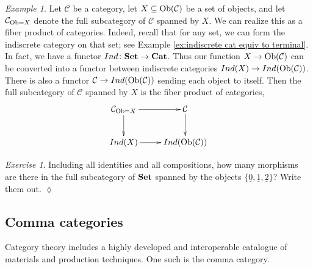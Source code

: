 \documentclass{book}
\def\tn{\textnormal}
\def\mc{\mathcal}
\def\Ob{\tn{Ob}}
\def\to{\rightarrow}
\def\taking{\colon}
\def\ss{\subseteq}
\def\ul{\underline}
\def\Cat{{\bf Cat}}
\def\Set{{\bf Set}}
\def\mcC{\mc{C}}
\theoremstyle{remark}
\newtheorem{example}[subsubsection]{Example}
\newtheorem{exc}[subsubsection]{Exercise}
\newenvironment{exercise}{\begin{exc}}{\hspace*{\fill}$\lozenge$\end{exc}}
\theoremstyle{definition}
\begin{document}
\begin{example}

Let $\mcC$ be a category, let $X\ss\Ob(\mcC)$ be a set of objects, and let $\mcC_{\Ob=X}$ denote the full subcategory of $\mcC$ spanned by $X$. We can realize this as a fiber product of categories. Indeed, recall that for any set, we can form the indiscrete category on that set; see Example \ref{ex:indiscrete cat equiv to terminal}. In fact, we have a functor $Ind\taking\Set\to\Cat$.\index{a functor!$Ind\taking\Set\to\Cat$} Thus our function $X\to\Ob(\mcC)$ can be converted into a functor between indiscrete categories $Ind(X)\to Ind(\Ob(\mcC))$. There is also a functor $\mcC\to Ind(\Ob(\mcC))$ sending each object to itself. Then the full subcategory of $\mcC$ spanned by $X$ is the fiber product of categories,
$$\xymatrix{\mcC_{\Ob=X}\ar[r]\ar[d]&\mcC\ar[d]\\Ind(X)\ar[r]&Ind(\Ob(\mcC))}$$

\end{example}

\begin{exercise}
Including all identities and all compositions, how many morphisms are there in the full subcategory of $\Set$ spanned by the objects $\{\ul{0},\ul{1},\ul{2}\}$? Write them out.
\end{exercise}


\subsection{Comma categories}\label{sec:comma}

Category theory includes a highly developed and interoperable catalogue of materials and production techniques. One such is the comma category.
\end{document}
